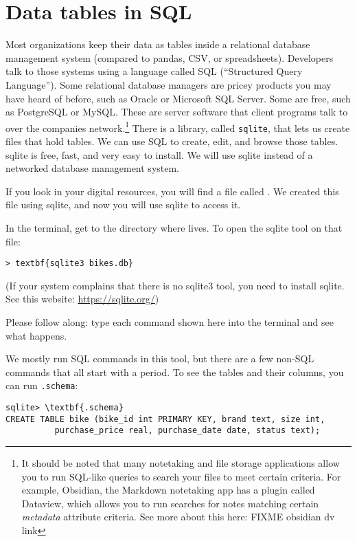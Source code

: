 \chapter{Data tables in SQL}

Most organizations keep their data as tables inside a relational
database management system (compared to pandas, CSV, or spreadsheets). Developers talk to those systems using a
language called SQL (``Structured Query Language'').
Some relational database managers are pricey products you may have
heard of before, such as Oracle or Microsoft SQL Server. Some are free, such as
PostgreSQL or MySQL. These are server software that client programs
talk to over the companies network.\footnote{It should be noted that many notetaking and file storage applications allow you to run SQL-like queries to search your files to meet certain criteria. For example, Obsidian, the Markdown notetaking app has a plugin called Dataview, which allows you to run searches for notes matching certain \emph{metadata} attribute criteria. See more about this here: FIXME obsidian dv link}
There is a library, called \texttt{sqlite}, that lets us create files that hold
tables. We can use SQL to create, edit, and browse those tables.
sqlite is free, fast, and very easy to install. We will use sqlite
instead of a networked database management system.

If you look in your digital resources, you will find a file called
. We created this file using sqlite, and now you
will use sqlite to access it.

In the terminal, get to the directory where  lives. To open the sqlite tool on that file:

\begin{Verbatim}[commandchars=\\\{\}]
> textbf{sqlite3 bikes.db}
\end{Verbatim}

(If your system complains that there is no sqlite3 tool, you need to install sqlite. See this website: \url{https://sqlite.org/})

Please follow along: type each command shown here into the terminal
and see what happens.

We mostly run SQL commands in this tool, but there are a few non-SQL
 commands that all start with a period. To see the tables and their
 columns, you can run \texttt{.schema}:

\begin{Verbatim}[commandchars=\\\{\}]
sqlite> \textbf{.schema}
CREATE TABLE bike (bike_id int PRIMARY KEY, brand text, size int,
          purchase_price real, purchase_date date, status text);
\end{Verbatim}

